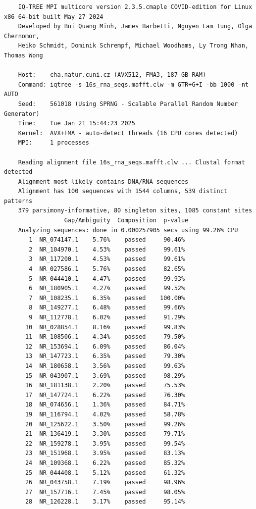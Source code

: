 \documentclass{article}
\begin{document}
\begin{verbatim}
    IQ-TREE MPI multicore version 2.3.5.cmaple COVID-edition for Linux x86 64-bit built May 27 2024
    Developed by Bui Quang Minh, James Barbetti, Nguyen Lam Tung, Olga Chernomor,
    Heiko Schmidt, Dominik Schrempf, Michael Woodhams, Ly Trong Nhan, Thomas Wong
    
    Host:    cha.natur.cuni.cz (AVX512, FMA3, 187 GB RAM)
    Command: iqtree -s 16s_rna_seqs.mafft.clw -m GTR+G+I -bb 1000 -nt AUTO
    Seed:    561018 (Using SPRNG - Scalable Parallel Random Number Generator)
    Time:    Tue Jan 21 15:44:23 2025
    Kernel:  AVX+FMA - auto-detect threads (16 CPU cores detected)
    MPI:     1 processes
    
    Reading alignment file 16s_rna_seqs.mafft.clw ... Clustal format detected
    Alignment most likely contains DNA/RNA sequences
    Alignment has 100 sequences with 1544 columns, 539 distinct patterns
    379 parsimony-informative, 80 singleton sites, 1085 constant sites
                 Gap/Ambiguity  Composition  p-value
    Analyzing sequences: done in 0.000257905 secs using 99.26% CPU
       1  NR_074147.1    5.76%    passed     90.46%
       2  NR_104970.1    4.53%    passed     99.61%
       3  NR_117200.1    4.53%    passed     99.61%
       4  NR_027586.1    5.76%    passed     82.65%
       5  NR_044410.1    4.47%    passed     99.93%
       6  NR_180905.1    4.27%    passed     99.52%
       7  NR_108235.1    6.35%    passed    100.00%
       8  NR_149277.1    6.48%    passed     99.66%
       9  NR_112778.1    6.02%    passed     91.29%
      10  NR_028854.1    8.16%    passed     99.83%
      11  NR_108506.1    4.34%    passed     79.50%
      12  NR_153694.1    6.09%    passed     86.04%
      13  NR_147723.1    6.35%    passed     79.30%
      14  NR_180658.1    3.56%    passed     99.63%
      15  NR_043907.1    3.69%    passed     98.29%
      16  NR_181138.1    2.20%    passed     75.53%
      17  NR_147724.1    6.22%    passed     76.30%
      18  NR_074656.1    1.36%    passed     84.71%
      19  NR_116794.1    4.02%    passed     58.78%
      20  NR_125622.1    3.50%    passed     99.26%
      21  NR_136419.1    3.30%    passed     79.71%
      22  NR_159278.1    3.95%    passed     99.54%
      23  NR_151968.1    3.95%    passed     83.13%
      24  NR_109368.1    6.22%    passed     85.32%
      25  NR_044408.1    5.12%    passed     61.32%
      26  NR_043758.1    7.19%    passed     98.96%
      27  NR_157716.1    7.45%    passed     98.05%
      28  NR_126228.1    3.17%    passed     95.14%

\end{verbatim}
\end{document}
